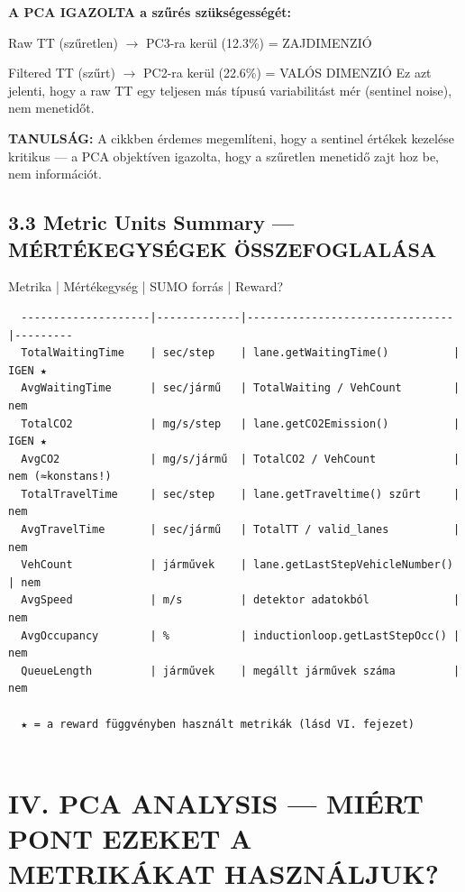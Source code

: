 \documentclass[11pt,a4paper]{article}
\begin{document}
\textbf{A PCA IGAZOLTA a szűrés szükségességét:}
\par\noindent\hspace*{1em}\textbullet{} Raw TT (szűretlen) $\rightarrow$ PC3-ra kerül (12.3\%) = ZAJDIMENZIÓ
\par\noindent\hspace*{1em}\textbullet{} Filtered TT (szűrt) $\rightarrow$ PC2-ra kerül (22.6\%) = VALÓS DIMENZIÓ
Ez azt jelenti, hogy a raw TT egy teljesen más típusú variabilitást
mér (sentinel noise), nem menetidőt.

\textbf{TANULSÁG:} A cikkben érdemes megemlíteni, hogy a sentinel értékek
kezelése kritikus — a PCA objektíven igazolta, hogy a szűretlen
menetidő zajt hoz be, nem információt.

\subsection*{3.3 Metric Units Summary — MÉRTÉKEGYSÉGEK ÖSSZEFOGLALÁSA}
Metrika             | Mértékegység | SUMO forrás                    | Reward?
\vspace{1em}\begin{verbatim}
  --------------------|-------------|--------------------------------|---------
  TotalWaitingTime    | sec/step    | lane.getWaitingTime()          | IGEN ★
  AvgWaitingTime      | sec/jármű   | TotalWaiting / VehCount        | nem
  TotalCO2            | mg/s/step   | lane.getCO2Emission()          | IGEN ★
  AvgCO2              | mg/s/jármű  | TotalCO2 / VehCount            | nem (≈konstans!)
  TotalTravelTime     | sec/step    | lane.getTraveltime() szűrt     | nem
  AvgTravelTime       | sec/jármű   | TotalTT / valid_lanes          | nem
  VehCount            | járművek    | lane.getLastStepVehicleNumber() | nem
  AvgSpeed            | m/s         | detektor adatokból             | nem
  AvgOccupancy        | %           | inductionloop.getLastStepOcc() | nem
  QueueLength         | járművek    | megállt járművek száma         | nem

  ★ = a reward függvényben használt metrikák (lásd VI. fejezet)


\end{verbatim}
\section*{IV. PCA ANALYSIS — MIÉRT PONT EZEKET A METRIKÁKAT HASZNÁLJUK?}
\end{document}
